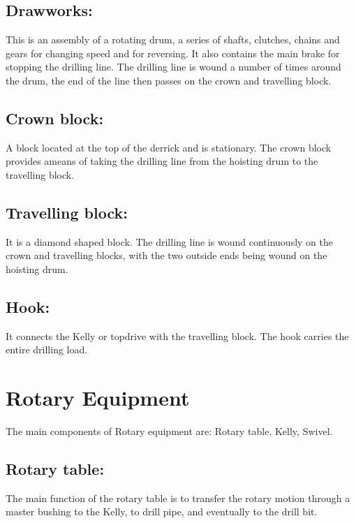 \vspace{1em}

\subsection*{\textbf{Drawworks:}} This is an assembly of a rotating drum, a series of shafts, 
clutches, chains and gears for changing speed and for reversing.
 It also contains the main brake for stopping the drilling line. 
The drilling line is wound a number of times around the drum, 
the end of the line then passes on the crown and travelling block.

\vspace{1em}

\subsection*{\textbf{Crown block:}} A block located at the top of the derrick and is stationary.
 The crown block provides ameans of taking the drilling line from the hoisting drum to the travelling block.

\vspace{1em}

\subsection*{\textbf{Travelling block:}} It is a diamond shaped block. 
The drilling line is wound continuously on the crown and travelling blocks,
 with the two outside ends being wound on the hoisting drum.

\vspace{1em}

\subsection*{\textbf{Hook:}} It connects the Kelly or topdrive with the travelling block. The hook carries the entire drilling load.

\section{Rotary Equipment}

The main components of Rotary equipment are: Rotary table, Kelly, Swivel.

\subsection*{\textbf{Rotary table:}} The main function of the rotary table is to transfer
 the rotary motion through a master bushing to the Kelly, to drill pipe, and eventually to the drill bit.

